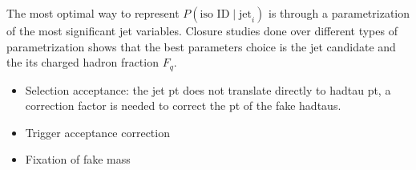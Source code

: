 The most optimal way to represent $P(\text{iso ID}\mid \text{jet}_{i})$ is through a parametrization of the most significant jet variables. Closure studies done over different types of parametrization shows that the best parameters choice is the jet candidate \pt and the its charged hadron fraction $F_{q}$.



\begin{itemize}
	\item Selection acceptance: the jet pt does not translate directly to hadtau pt, a correction factor is needed to correct the pt of the fake hadtaus.
	\item Trigger acceptance correction
	\item Fixation of fake \hadtau mass
\end{itemize}

